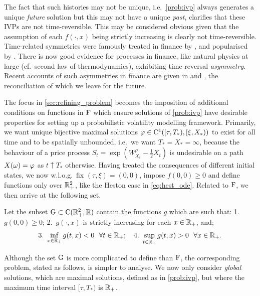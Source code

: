 The fact that such histories may not be unique, i.e.~\autoref{prob:ivp} always generates a unique \emph{future} solution but this may not have a unique \emph{past}, clarifies that these IVPs are not time-reversible. This may be considered obvious given that the assumption of each $f(\cdot,x)$ being strictly increasing is clearly not time-reversible. Time-related symmetries were famously treated in finance by \cite{zumbach_2009}, and popularised by \cite{blanc_2017}. There is now good evidence for processes in finance, like natural physics at large (cf.~second law of thermodynamics), exhibiting time reversal \emph{asymmetry}. Recent accounts of such asymmetries in finance are given in \cite{eleuch_2020} and \cite{cordi_2021}, the reconciliation of which we leave for the future.

The focus in \autoref{sec:refining_problem} becomes the imposition of additional conditions on functions in $\mathrm{F}$ which ensure solutions of \autoref{prob:ivp} have desirable properties for setting up a probabilistic volatility modelling framework. Primarily, we want unique bijective maximal solutions $\varphi\in\mathrm{C}^1([\tau,T_*),[\xi,X_*))$ to exist for all time and to be spatially unbounded, i.e.~we want $T_*=X_*=\infty$, because the behaviour of a price process $S_t=\exp(W^\rho_{X_t} - \frac12 X_t)$ is undesirable on a path $X(\omega)=\varphi$ as $t\uparrow T_*$ otherwise. Having treated the consequences of different initial states, we now w.l.o.g.~fix $(\tau,\xi)=(0,0)$, impose $f(0,0)\ge0$ and define functions only over $\mathbb{R}^2_+$, like the Heston case in \autoref{eq:hest_ode}. Related to $\mathrm{F}$, we then arrive at the following set.
\begin{definition}\label{def:mod_driving_func}
    Let the subset $\mathrm{G}\subset\mathrm{C}(\mathbb{R}_+^2,\mathbb{R})$ contain the functions $g$ which are such that: 1.~$g(0,0)\ge0$; 2.~$g(\cdot,x)$ is strictly increasing for each $x\in\mathbb{R}_+$, and;
    \begin{equation}\label{eq:assumptions_G}
        \text{3.~}\inf_{x\in\mathbb{R}_+}g(t,x)<0\ \ \forall t\in\mathbb{R}_+; \quad\text{4.~} \sup_{t\in\mathbb{R}_+}g(t,x)>0\ \ \forall x\in\mathbb{R}_+.
    \end{equation}
\end{definition}

Although the set $\mathrm{G}$ is more complicated to define than $\mathrm{F}$, the corresponding problem, stated as follows, is simpler to analyse. We now only consider \emph{global} solutions, which are maximal solutions, defined as in \autoref{prob:ivp}, but where the maximum time interval $[\tau,T_*)$ is $\mathbb{R}_+$.

